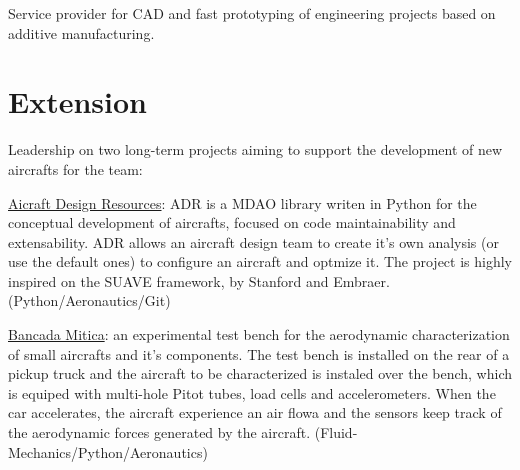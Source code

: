 \documentclass[A4]{deedy-resume} %
\begin{document}
\begin{minipage}[t]{0.67\textwidth}
\vspace{\topsep} %
\begin{tightitemize}
\item Service provider for CAD and fast prototyping of engineering projects based on additive manufacturing.
\end{tightitemize}
\sectionspace %

\section{Extension}

\vspace{\topsep} %
\begin{tightitemize}

\item Leadership on two long-term projects aiming to support the development of new aircrafts for the team:
\newline{}
\begin{tightitemize}
\item \href{https://github.com/CeuAzul/ADR}{Aicraft Design Resources}: ADR is a MDAO library writen in Python for the conceptual development of aircrafts, focused on code maintainability and extensability. ADR allows an aircraft design team to create it's own analysis (or use the default ones) to configure an aircraft and optmize it. The project is highly inspired on the SUAVE framework, by Stanford and Embraer. (Python/Aeronautics/Git)

\item \href{https://github.com/rafaellehmkuhl/Bancada-Mitica-Parts-Models}{Bancada Mitica}: an experimental test bench for the aerodynamic characterization of small aircrafts and it's components. The  test bench is installed on the rear of a pickup truck and the aircraft to be characterized is instaled over the bench, which is equiped with multi-hole Pitot tubes, load cells and accelerometers. When the car accelerates, the aircraft experience an air flowa and the sensors keep track of the aerodynamic forces generated by the aircraft. (Fluid-Mechanics/Python/Aeronautics)
\end{tightitemize}

\end{tightitemize}

\sectionspace %

\end{minipage} %
\end{document}

